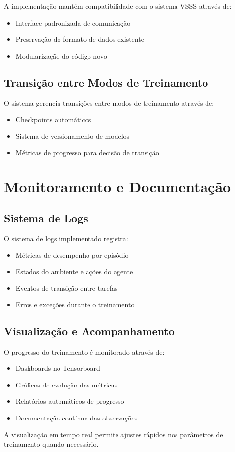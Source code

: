 A implementação mantém compatibilidade com o sistema VSSS através de:

\begin{itemize}
    \item Interface padronizada de comunicação
    \item Preservação do formato de dados existente
    \item Modularização do código novo
\end{itemize}

\subsection{Transição entre Modos de Treinamento}

O sistema gerencia transições entre modos de treinamento através de:

\begin{itemize}
    \item Checkpoints automáticos
    \item Sistema de versionamento de modelos
    \item Métricas de progresso para decisão de transição
\end{itemize}

\section{Monitoramento e Documentação}

\subsection{Sistema de Logs}

O sistema de logs implementado registra:

\begin{itemize}
    \item Métricas de desempenho por episódio
    \item Estados do ambiente e ações do agente
    \item Eventos de transição entre tarefas
    \item Erros e exceções durante o treinamento
\end{itemize}

\subsection{Visualização e Acompanhamento}

O progresso do treinamento é monitorado através de:

\begin{itemize}
    \item Dashboards no Tensorboard
    \item Gráficos de evolução das métricas
    \item Relatórios automáticos de progresso
    \item Documentação contínua das observações
\end{itemize}

A visualização em tempo real permite ajustes rápidos nos parâmetros de treinamento quando necessário.